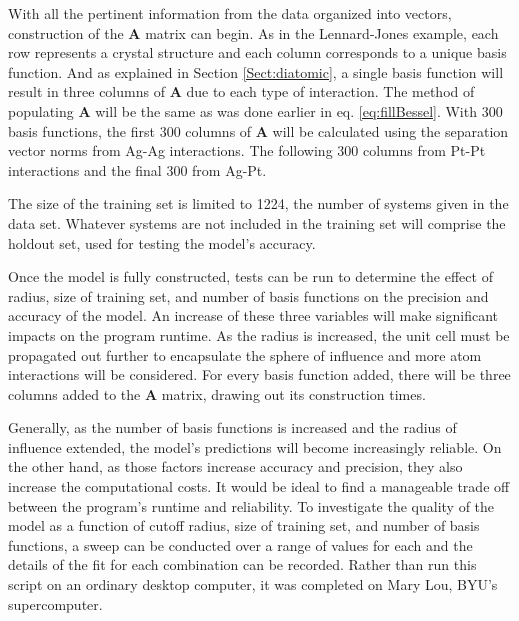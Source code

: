 With all the pertinent information from the data organized into vectors, construction of the $\mathbf{A}$ matrix can begin. As in the Lennard-Jones example, each row represents a crystal structure and each column corresponds to a unique basis function. And as explained in Section \ref{Sect:diatomic}, a single basis function will result in three columns of $\mathbf{A}$ due to each type of interaction. The method of populating $\mathbf{A}$ will be the same as was done earlier in eq. \ref{eq:fillBessel}. With 300 basis functions, the first 300 columns of $\mathbf{A}$ will be calculated using the separation vector norms from Ag-Ag interactions. The following 300 columns from Pt-Pt interactions and the final 300 from Ag-Pt.
\par The size of the training set is limited to 1224, the number of systems given in the data set. Whatever systems are not included in the training set will comprise the holdout set, used for testing the model's accuracy.
\par Once the model is fully constructed, tests can be run to determine the effect of radius, size of training set, and number of basis functions on the precision and accuracy of the model. An increase of these three variables will make significant impacts on the program runtime. As the radius is increased, the unit cell must be propagated out further to encapsulate the sphere of influence and more atom interactions will be considered. For every basis function added, there will be three columns added to the $\mathbf{A}$ matrix, drawing out its construction times. 
\par Generally, as the number of basis functions is increased and the radius of influence extended, the model's predictions will become increasingly reliable. On the other hand, as those factors increase accuracy and precision, they also increase the computational costs. It would be ideal to find a manageable trade off between the program's runtime and reliability. To investigate the quality of the model as a function of cutoff radius, size of training set, and number of basis functions, a sweep can be conducted over a range of values for each and the details of the fit for each combination can be recorded. Rather than run this script on an ordinary desktop computer, it was completed on Mary Lou, BYU's supercomputer. 
